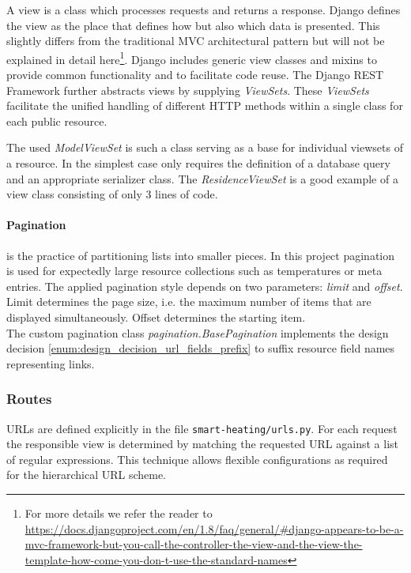 A view is a class which processes requests and returns a response.
Django defines the view as the place that defines how but also which data is presented.
This slightly differs from the traditional MVC architectural pattern but will not be explained in detail here\footnote{For more details we refer the reader to \url{https://docs.djangoproject.com/en/1.8/faq/general/\#django-appears-to-be-a-mvc-framework-but-you-call-the-controller-the-view-and-the-view-the-template-how-come-you-don-t-use-the-standard-names}}.
Django includes generic view classes and mixins to provide common functionality and to facilitate code reuse.
The Django REST Framework further abstracts views by supplying \emph{ViewSets}.
These \emph{ViewSets} facilitate the unified handling of different HTTP methods within a single class for each public resource.

The used \emph{ModelViewSet} is such a class serving as a base for individual viewsets of a resource.
In the simplest case only requires the definition of a database query and an appropriate serializer class.
The \emph{ResidenceViewSet} is a good example of a view class consisting of only 3 lines of code.

\paragraph{Pagination} is the practice of partitioning lists into smaller pieces.
In this project pagination is used for expectedly large resource collections such as temperatures or meta entries.
The applied pagination style depends on two parameters: \emph{limit} and \emph{offset}.
Limit determines the page size, i.e. the maximum number of items that are displayed simultaneously.
Offset determines the starting item.\\
The custom pagination class \emph{pagination.BasePagination} implements the design decision \ref{enum:design_decision_url_fields_prefix} to suffix resource field names representing links.

\subsubsection{Routes}
\label{sec:server_infrastructure_routers}

URLs are defined explicitly in the file \texttt{smart-heating/urls.py}.
For each request the responsible view is determined by matching the requested URL against a list of regular expressions.
This technique allows flexible configurations as required for the hierarchical URL scheme.


